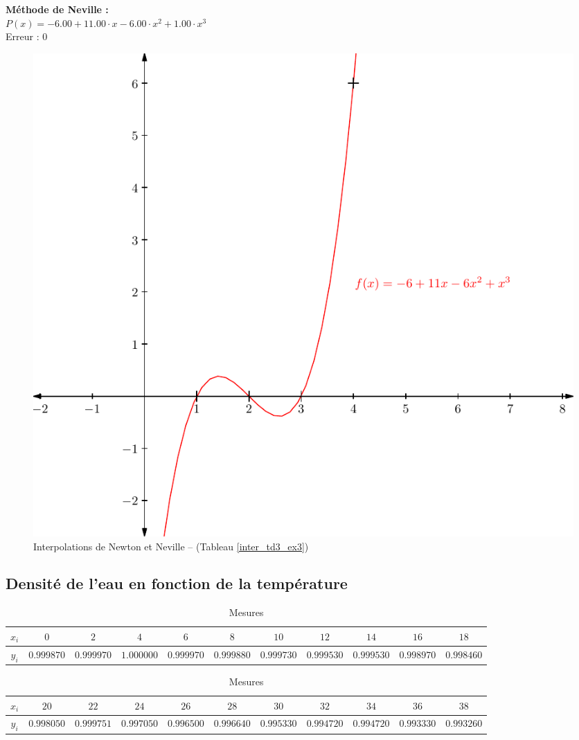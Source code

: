 \documentclass{report}
\begin{document}
	\noindent\textbf{Méthode de Neville :}\\
	$P(x)= -6.00 + 11.00 \cdot x- 6.00 \cdot x^{2}  + 1.00 \cdot x^{3} $\\
	Erreur : $0$
	\newline
	\newline
	
	\begin{figure}[h]
	  \centering
	  \includegraphics[scale=0.7]{graphiques/pdf_output/inter_test1.pdf}
	  \caption{Interpolations de Newton et Neville -- (Tableau \ref{inter_td3_ex3})}
	\end{figure}
      \newpage
      
      \subsection{Densité de l'eau en fonction de la température}      
	\begin{table}[h]
	  \centering
	  \begin{tabular}{| c | c | c | c | c | c | c | c | c | c | c |}
	    \hline 
	    $x_{i}$ & $0$ & $2$ & $4$ & $6$ & $8$ & $10$ & $12$ & $14$ & $16$ & $18$ \\
	    \hline 
	    $y_{i}$ & $0.999870$ & $0.999970$ & $1.000000$ & $0.999970$ & $0.999880$ & $0.999730$ & $0.999530$ & $0.999530$ & $0.998970$ & $0.998460$ \\ 
	    \hline 
	  \end{tabular}
	  \begin{tabular}{| c | c | c | c | c | c | c | c | c | c | c |}
	    \hline
	    $x_{i}$ & $20$ & $22$ & $24$ & $26$ & $28$ & $30$ & $32$ & $34$ & $36$ & $38$ \\ 
	    \hline
	    $y_{i}$ & $0.998050$ & $0.999751$ & $0.997050$ & $0.996500$ & $0.996640$ & $0.995330$ & $0.994720$ & $0.994720$ & $0.993330$ & $0.993260$ \\
	    \hline
	  \end{tabular}
	  \caption{Mesures}
	  \label{inter_tp2_ex1_densite}
	\end{table}
	
\end{document}
